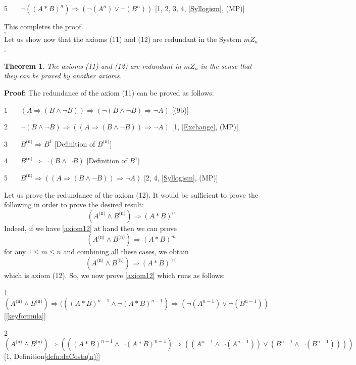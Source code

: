 \documentclass{llncs}
\newtheorem{theo}{Theorem}
\begin{document}
5 \ \ \ $\neg ((A\ast B)^n)\Rightarrow (\neg (A^n) \lor \neg (B^n))$
\hfill[1, 2, 3, 4, \eqref{Syllogism}, (MP)]

\noindent This completes the proof.
\\$\square$\\
Let us  show now that the axioms (11) and (12) are redundant in the
System $mZ_n$.
\begin{theo}\label{thm:axiom11redundant}
The axioms (11) and (12) are redundant in $mZ_n$ in the sense that
they can be proved by another axioms.
\end{theo}
\textbf{Proof:} The redundance of the axiom (11) can be proved as
follows:

1 \ \ \ $(A \Rightarrow (B\land \neg B))\Rightarrow (\neg (B\land
\neg B)\Rightarrow \neg A)$ \hfill[(9b)]

2 \ \ \ $\neg (B\land \neg B) \Rightarrow ((A \Rightarrow (B\land
\neg B))\Rightarrow \neg A)$ \hfill[1, \eqref{Exchange}, (MP)]

3 \ \ \ $B^{\text{(n)}} \Rightarrow B^1$ \hfill[Definition of
$B^{\text{(n)}}$]

4 \ \ \ $B^{\text{(n)}} \Rightarrow \neg (B\land \neg B)$
\hfill[Definition of $B^1$]

5 \ \ \ $B^{\text{(n)}} \Rightarrow ((A \Rightarrow (B\land \neg
B))\Rightarrow \neg A)$ \hfill[2, 4, \eqref{Syllogism}, (MP)]

\noindent Let us prove the redundance of the axiom (12).
 It would be sufficient to prove the following in
order to prove the desired result:
\[ (A^{\text{(n)}} \land B^{\text{(n)}}) \Rightarrow (A \ast B)^n \tag{$\diamondsuit $} \label{axiom12} \]
Indeed, if we have \eqref{axiom12} at hand then we can prove
\[ (A^{\text{(n)}} \land B^{\text{(n)}}) \Rightarrow (A \ast B)^m \]
for any $1\leq m\leq n$ and combining all these cases, we obtain
\[ (A^{\text{(n)}} \land B^{\text{(n)}}) \Rightarrow (A \ast B)^{\text{(n)}} \]
which is axiom (12). So, we now prove \eqref{axiom12} which runs as
follows:

1 \ \ \ $(A^{\text{(n)}} \land B^{\text{(n)}}) \Rightarrow (((A\ast
B)^{n-1}\land \neg (A\ast B)^{n-1})\Rightarrow (\neg (A^{n-1})\lor
\neg (B^{n-1}))$ \hfill[\eqref{keyformula}]

2 \ \ \ $(A^{\text{(n)}} \land B^{\text{(n)}}) \Rightarrow (((A\ast
B)^{n-1}\land \neg (A\ast B)^{n-1})\Rightarrow ((A^{n-1} \land \neg
(A^{n-1}))\lor (B^{n-1}\land \neg (B^{n-1}))))$ \\ \hfill[1,
Definition\ref{defn:daCosta(n)}]
\end{document}
